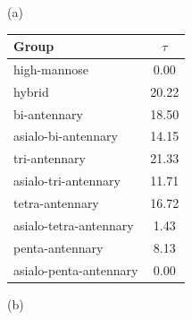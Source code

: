     \begin{table}
        \begin{minipage}[t]{0.25\linewidth}
            \vspace{0pt}
            (a)
            \centering
            
    \begin{tabular}{l | c}
        Group & $\tau$ \\
        \hline
        high-mannose & 0.00 \\
        hybrid & 20.22 \\
        bi-antennary & 18.50 \\
        asialo-bi-antennary & 14.15 \\
        tri-antennary & 21.33 \\
        asialo-tri-antennary & 11.71 \\
        tetra-antennary & 16.72 \\
        asialo-tetra-antennary & 1.43 \\
        penta-antennary & 8.13 \\
        asialo-penta-antennary & 0.00 \\
    \end{tabular}
    
            
        \end{minipage}
        \hspace{1cm}
        \begin{minipage}[t]{0.55\linewidth}
            \vspace{0pt}
            (b)
            \centering
            

\end{minipage}
\end{table}
